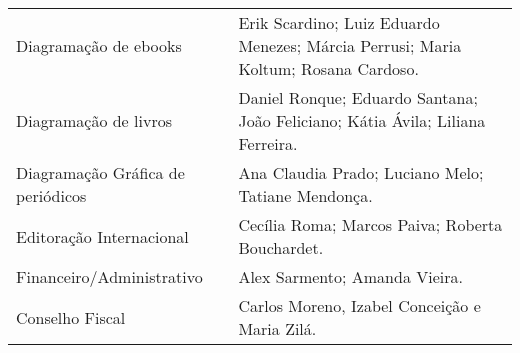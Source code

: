 \documentclass{gescons}
\begin{document}
\begin{longtable}[]{@{}
  >{\raggedright\arraybackslash}p{}
  >{\raggedright\arraybackslash}p{}@{}}
\begin{minipage}[b]{\linewidth}
\end{minipage} \\
\hline
\begin{minipage}[b]{\linewidth}\raggedright
Diagramação de ebooks
\end{minipage} & \begin{minipage}[b]{\linewidth}\raggedright\addlinespace[4pt]
Erik Scardino; Luiz Eduardo Menezes; Márcia Perrusi; Maria Koltum; Rosana Cardoso.
\end{minipage} \\
\hline
\begin{minipage}[b]{\linewidth}\raggedright
Diagramação de livros
\end{minipage} & \begin{minipage}[b]{\linewidth}\raggedright
Daniel Ronque; Eduardo Santana; João Feliciano; Kátia Ávila; Liliana Ferreira.
\end{minipage} \\
\hline
\begin{minipage}[b]{\linewidth}\raggedright
Diagramação Gráfica de periódicos
\end{minipage} & \begin{minipage}[b]{\linewidth}\raggedright
Ana Claudia Prado; Luciano Melo; Tatiane Mendonça.
\end{minipage} \\
\hline
\begin{minipage}[b]{\linewidth}\raggedright
Editoração Internacional
\end{minipage} & \begin{minipage}[b]{\linewidth}\raggedright
Cecília Roma; Marcos Paiva; Roberta Bouchardet.
\end{minipage} \\
\hline
\begin{minipage}[b]{\linewidth}\raggedright
Financeiro/Administrativo
\end{minipage} & \begin{minipage}[b]{\linewidth}\raggedright\addlinespace[2pt]
Alex Sarmento; Amanda Vieira.
\end{minipage} \\
\hline
\begin{minipage}[b]{\linewidth}\raggedright
Conselho Fiscal
\end{minipage} & \begin{minipage}[b]{\linewidth}\raggedright\addlinespace[2pt]
Carlos Moreno, Izabel Conceição e Maria Zilá.
\end{minipage} \\

\end{longtable}
\end{document}
